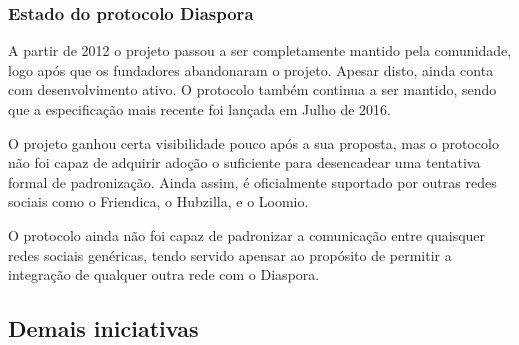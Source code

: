 \subsubsection{Estado do protocolo Diaspora}

A partir de 2012 o projeto passou a ser completamente mantido pela comunidade, logo
após que os fundadores abandonaram o projeto. Apesar disto, ainda conta com
desenvolvimento ativo. O protocolo também continua a ser mantido, sendo que a
especificação mais recente foi lançada em Julho de 2016.

O projeto ganhou certa visibilidade pouco após a sua proposta, mas o protocolo não
foi capaz de adquirir adoção o suficiente para desencadear uma tentativa formal de
padronização. Ainda assim, é oficialmente suportado por outras redes sociais como o
Friendica, o Hubzilla, e o Loomio.

O protocolo ainda não foi capaz de padronizar a comunicação entre quaisquer redes
sociais genéricas, tendo servido apensar ao propósito de permitir a integração
de qualquer outra rede com o Diaspora.


\subsection{Demais iniciativas}

